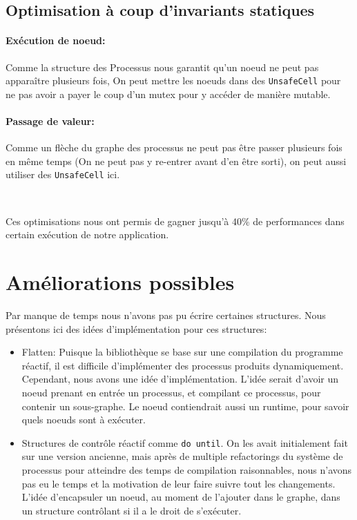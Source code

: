 \documentclass[a4paper]{article}
\renewcommand{\(}{\left(}
\renewcommand{\)}{\right)}
\begin{document}
\subsection{Optimisation à coup d'invariants statiques}

\paragraph{Exécution de noeud:} Comme la structure des Processus nous garantit
qu'un noeud ne peut pas apparaître plusieurs fois, On peut mettre les noeuds
dans des \verb!UnsafeCell! pour ne pas avoir a payer le coup d'un mutex pour y
accéder de manière mutable.

\paragraph{Passage de valeur:} Comme un flèche du graphe des processus ne peut
pas être passer plusieurs fois en même temps (On ne peut pas y re-entrer avant
d'en être sorti), on peut aussi utiliser des \verb!UnsafeCell! ici. 

\

Ces optimisations nous ont permis de gagner jusqu'à 40\% de performances dans
certain exécution de notre application.
\section{Améliorations possibles}

Par manque de temps nous n'avons pas pu
écrire certaines structures. Nous présentons ici des idées d'implémentation pour
ces structures:

\begin{itemize}
\item Flatten: Puisque la bibliothèque se base sur une compilation du programme
  réactif, il est difficile d'implémenter des processus produits dynamiquement.
  Cependant, nous avons une idée d'implémentation. L'idée serait d'avoir un
  noeud prenant en entrée un processus, et compilant ce processus, pour contenir
  un sous-graphe. Le noeud contiendrait aussi un runtime, pour savoir quels
  noeuds sont à exécuter.
\item Structures de contrôle réactif comme \verb!do until!. On les avait
  initialement fait sur une version ancienne, mais après de multiple refactorings
  du système de processus pour atteindre des temps de compilation raisonnables,
  nous n'avons pas eu le temps et la motivation de leur faire suivre tout les
  changements. L'idée d'encapsuler un noeud, au moment de l'ajouter dans le
  graphe, dans un structure contrôlant si il a le droit de s'exécuter.
\end{itemize}
\pagebreak
\end{document}
